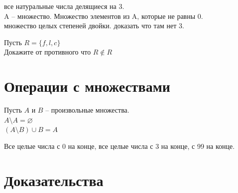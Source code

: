 \documentclass[12pt]{article}
\begin{document}
все натуральные числа делящиеся на 3.\\

A -- множество. Множество элементов из A, которые не равны 0.\\
множество целых степеней двойки. доказать что там нет 3.

Пусть $R=\{f,l,c\}$\\
Докажите от противного что $R \notin R$
\section{Операции с множествами}
Пусть $A$ и $B$ -- произвольные множества.\\
$A\setminus A=\varnothing$\\
$(A\setminus B)\cup B=A$

Все целые числа с 0 на конце, все целые числа с 3 на конце, с 99 на конце.
\section{Доказательства}
\end{document}
